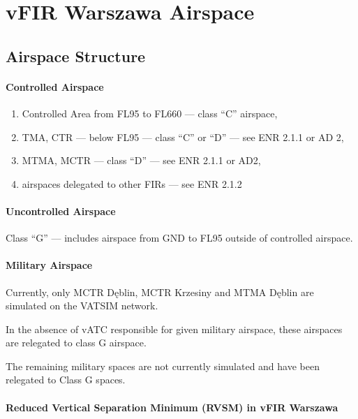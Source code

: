 \chapter{vFIR Warszawa Airspace}
\label{ch:airspace}
\section{Airspace Structure}
\label{sect:airspace:structure}

\subsubsection{Controlled Airspace}
\begin{enumerate}[label=\alph*)]
    \item Controlled Area from FL95 to FL660 --- class ``C'' airspace,
    \item TMA, CTR --- below FL95 --- class ``C'' or ``D'' --- see ENR 2.1.1 or AD 2,
    \item MTMA, MCTR --- class ``D'' --- see ENR 2.1.1 or AD2,
    \item airspaces delegated to other FIRs --- see ENR 2.1.2
\end{enumerate}

\subsubsection{Uncontrolled Airspace}
Class ``G'' --- includes airspace from GND to FL95 outside of controlled airspace.

\subsubsection{Military Airspace}

Currently, only MCTR Dęblin, MCTR Krzesiny and MTMA Dęblin are simulated on the VATSIM network.

In the absence of vATC responsible for given military airspace, these airspaces are relegated to class G airspace.

The remaining military spaces are not currently simulated and have been relegated to Class G spaces.

\subsubsection{Reduced Vertical Separation Minimum (RVSM) in vFIR Warszawa}